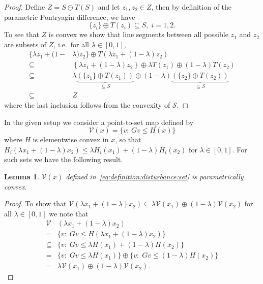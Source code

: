 \documentclass[letterpaper, 10pt, conference]{ieeeconf} %
\newtheorem{thm}{Lemma}[section]
\begin{document}
%
    \begin{proof}
      Define $ Z =  S\ominus T( S)$ and let $z_1,z_2\in Z$, then
      by definition of the parametric Pontryagin difference, we have
      \begin{equation}
        \{z_i\} \oplus T(z_i) \subseteq S,\; i=1,2.
      \end{equation}
      To see that $ Z$ is convex we show that line segments between
      all possible $z_1$ and $z_2$ are subsets of $ Z$, i.e.~for all $\lambda \in [0,1]$,
      \[\begin{aligned}
        \{ \lambda z_1 + (1-&\lambda)z_2
        \}\oplus T\left( \lambda z_1 + (1-\lambda)z_2\right)\\
        \subseteq&\left\{ \lambda z_1 + (1-\lambda)z_2
        \right\}\oplus \lambda T(z_1) \oplus (1-\lambda)
         T(z_2)\\
        \subseteq &\lambda\underbrace{(\{z_1\}\oplus T(z_1))}_{\subseteq S}\oplus
        (1-\lambda)\underbrace{(\{z_2\}\oplus T(z_2))}_{\subseteq S}\\
        \subseteq& Z
        \end{aligned}\]
      where the last inclusion follows from the convexity of $\mathcal S$.
    \end{proof}
%
%
    In the given setup we consider a point-to-set map defined by
    \begin{equation}\label{eq:definition:disturbance:set}
      \mathcal V(x) = \{v:\,G v \leq H(x)\}
    \end{equation}
    where $H$ is elementwise convex in $x$, so that 
    $H_i(\lambda x_1+(1-\lambda)x_2)\leq \lambda H_i(x_1)+(1-\lambda)H_i(x_2)$ for 
    $\lambda\in[0,1]$.  For such sets we have the following result.
    \begin{thm}\label{thm:convex:parametric:set}
      $\mathcal V (x)$ defined in~\eqref{eq:definition:disturbance:set} is parametrically convex.
    \end{thm}
%
    \begin{proof}
      To show that $\mathcal V(\lambda x_1 + (1-\lambda)x_2)\subseteq 
      \lambda\mathcal V(x_1) \oplus(1-\lambda)\mathcal V(x_2)$ for all $\lambda \in [0,1]$ we note that
        \begin{align*}
        \mathcal V&(\lambda x_1 + (1-\lambda)x_2)\\
        =& \{v:\; G v \leq H(\lambda x_1 + (1-\lambda)x_2)\}\\
        \subseteq& \{v:\;Gv\leq\lambda H(x_1)+(1-\lambda) H(x_2)\}\\
        =&\{v:\;Gv\leq\lambda H(x_1)\}\oplus\{v
        :\;Gv\leq(1-\lambda)H(x_2)\}\\
        =&\lambda\mathcal V(x_1)\oplus(1-\lambda)\mathcal V(x_2).
        \end{align*}
\baselineskip
    \end{proof} 
\end{document}
